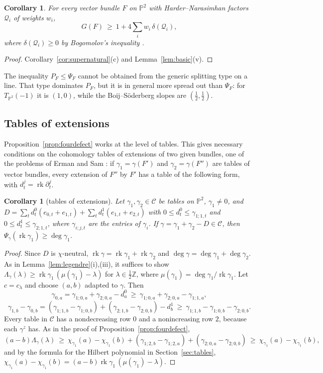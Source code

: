 \documentclass[11pt]{amsart}
\newtheorem{corollary}[theorem]{Corollary}
\theoremstyle{definition}
\theoremstyle{remark}
\newcommand{\PP}{\mathbb{P}}
\newcommand{\ZZ}{\mathbb{Z}}
\newcommand{\cQ}{\mathcal{Q}}
\newcommand{\CC}{\mathcal{C}}
\DeclareMathOperator{\rk}{rk}
\begin{document}
\begin{corollary}\label{cor:Q}
For every vector bundle $F$ on $\PP^2$ with Harder--Narasimhan factors $\cQ_i$ of weights $w_i$,
\[
G(F)\ \ge\ 1+4\sum_iw_i\,\delta(\cQ_i),
\]
where $\delta(\cQ_i)\ge0$ by Bogomolov's inequality \cite{Bo78,La04}.
\end{corollary}

\begin{proof}
Corollary~\ref{cor:supernatural}(c) and Lemma~\ref{lem:basic}(v).
\end{proof}

The inequality $P_F\le\Psi_F$ cannot be obtained from the generic splitting type on a line. That type dominates $P_F$, but it is in general more spread out than $\Psi_F$: for $T_{\PP^2}(-1)$ it is $(1,0)$, while the Boij--Söderberg slopes are $(\frac12,\frac12)$.

\subsection{Tables of extensions}
Proposition~\ref{prop:fourdefect} works at the level of tables. This gives necessary conditions on the cohomology tables of extensions of two given bundles, one of the problems of Erman and Sam \cite[Problem~4.3]{ErS}: if $\gamma_1=\gamma(F')$ and $\gamma_2=\gamma(F'')$ are tables of vector bundles, every extension of $F''$ by $F'$ has a table of the following form, with $d^j_t=\rk\partial^j_t$.

\begin{corollary}[tables of extensions]\label{cor:conicQ}
Let $\gamma_1,\gamma_2\in\CC$ be tables on $\PP^2$, $\gamma_1\ne0$, and $D=\sum_td^0_t(e_{0,t}+e_{1,t})+\sum_td^1_t(e_{1,t}+e_{2,t})$ with $0\le d^0_t\le\gamma_{1;1,t}$ and $0\le d^1_t\le\gamma_{2;1,t}$, where $\gamma_{i;j,t}$ are the entries of $\gamma_i$. If $\gamma=\gamma_1+\gamma_2-D\in\CC$, then $\Psi_\gamma(\rk\gamma_1)\ge\deg\gamma_1$.
\end{corollary}

\begin{proof}
Since $D$ is $\chi$-neutral, $\rk\gamma=\rk\gamma_1+\rk\gamma_2$ and $\deg\gamma=\deg\gamma_1+\deg\gamma_2$. As in Lemma~\ref{lem:legendre}(i),(iii), it suffices to show $\Lambda_\gamma(\lambda)\ge\rk\gamma_1\,(\mu(\gamma_1)-\lambda)$ for $\lambda\in\frac12\ZZ$, where $\mu(\gamma_1)=\deg\gamma_1/\rk\gamma_1$. Let $c=c_\lambda$ and choose $(a,b)$ adapted to $\gamma$. Then
\[
\gamma_{0,a}=\gamma_{1;0,a}+\gamma_{2;0,a}-d^0_a\ \ge\ \gamma_{1;0,a}+\gamma_{2;0,a}-\gamma_{1;1,a},
\]
\[
\gamma_{1,b}-\gamma_{0,b}=(\gamma_{1;1,b}-\gamma_{1;0,b})+(\gamma_{2;1,b}-\gamma_{2;0,b})-d^1_b\ \ge\ \gamma_{1;1,b}-\gamma_{1;0,b}-\gamma_{2;0,b}.
\]
Every table in $\CC$ has a nondecreasing row $0$ and a nonincreasing row $2$, because each $\gamma^z$ has. As in the proof of Proposition~\ref{prop:fourdefect},
\[
(a-b)\Lambda_\gamma(\lambda)\ \ge\ \chi_{\gamma_1}(a)-\chi_{\gamma_1}(b)+(\gamma_{1;2,b}-\gamma_{1;2,a})+(\gamma_{2;0,a}-\gamma_{2;0,b})\ \ge\ \chi_{\gamma_1}(a)-\chi_{\gamma_1}(b),
\]
and by the formula for the Hilbert polynomial in Section~\ref{sec:tables}, $\chi_{\gamma_1}(a)-\chi_{\gamma_1}(b)=(a-b)\rk\gamma_1\,(\mu(\gamma_1)-\lambda)$.
\end{proof}
\end{document}
